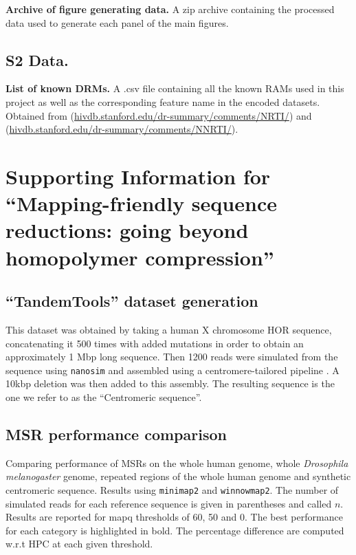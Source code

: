 \documentclass[
  11,
]{scrbook}
\begin{document}
\textbf{Archive of figure generating data.} A zip archive containing the
processed data used to generate each panel of the main figures.

\hypertarget{s2-data.}{%
\section{S2 Data.}\label{s2-data.}}

\textbf{List of known DRMs.} A .csv file containing all the known RAMs used
in this project as well as the corresponding feature name in the encoded
datasets. Obtained from
(\href{https://hivdb.stanford.edu/dr-summary/comments/NRTI/}{hivdb.stanford.edu/dr-summary/comments/NRTI/})
and
(\href{https://hivdb.stanford.edu/dr-summary/comments/NNRTI/}{hivdb.stanford.edu/dr-summary/comments/NNRTI/}).

\printbibliography[segment=\therefsegment,heading=subbibintoc,title={References for Appendix \thechapter}]

\hypertarget{HPC-appendix}{%
\chapter{Supporting Information for ``Mapping-friendly sequence reductions: going beyond homopolymer compression''}\label{HPC-appendix}}

\hypertarget{appendix:tandemtools}{%
\section{``TandemTools'' dataset generation}\label{appendix:tandemtools}}

This dataset was obtained by taking a human X chromosome HOR sequence,
concatenating it 500 times with added mutations in order to obtain an
approximately 1 Mbp long sequence. Then 1200 reads were simulated from
the sequence using \texttt{nanosim} \autocite{yangNanoSimNanoporeSequence2017} and
assembled using a centromere-tailored pipeline
\autocite{bzikadzeAutomatedAssemblyCentromeres2020}. A 10kbp deletion was then
added to this assembly. The resulting sequence is the one we refer to as
the ``Centromeric sequence''.

\hypertarget{tab:mapperComparison}{%
\section{MSR performance comparison}\label{tab:mapperComparison}}

Comparing performance of MSRs on the whole human genome, whole
\emph{Drosophila melanogaster} genome, repeated regions of the whole human
genome and synthetic centromeric sequence. Results using
\texttt{minimap2}\autocite{liMinimap2PairwiseAlignment2018} and
\texttt{winnowmap2}\autocite{jainWeightedMinimizerSampling2020}. The number of
simulated reads for each reference sequence is given in parentheses and
called \(n\). Results are reported for mapq thresholds of 60, 50 and 0.
The best performance for each category is highlighted in bold. The
percentage difference are computed w.r.t HPC at each given threshold.
\end{document}
